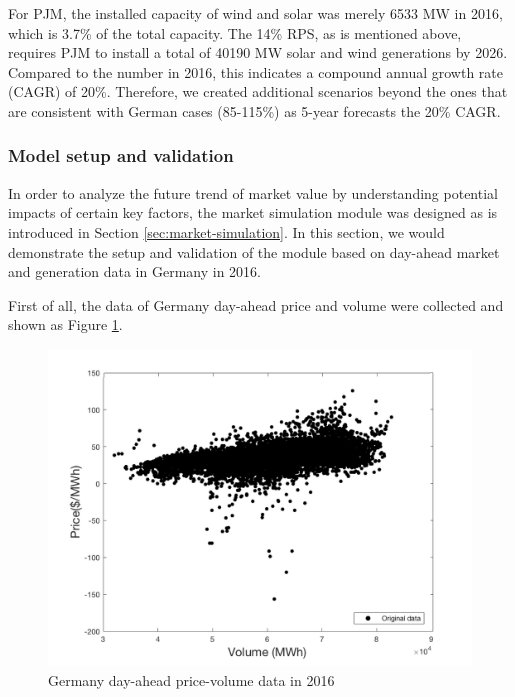 

For PJM, the installed capacity of wind and solar was merely 6533 MW in 2016, which is 3.7\% of the total capacity. The 14\% RPS, as is mentioned above, requires PJM to install a total of \num{40190} MW solar and wind generations by 2026. Compared to the number in 2016, this indicates a compound annual growth rate (CAGR) of 20\%. Therefore, we created additional scenarios beyond the ones that are consistent with German cases (85-115\%) as 5-year forecasts the 20\% CAGR.

\subsubsection{Model setup and validation}
In order to analyze the future trend of market value by understanding potential impacts of certain key factors, the market simulation module was designed as is introduced in Section \ref{sec:market-simulation}. In this section, we would demonstrate the setup and validation of the module  based on day-ahead market and generation data in Germany in 2016.

First of all, the data of Germany day-ahead price and volume were collected and shown as Figure \ref{fig:merit-orignal}.

\begin{figure}[h!]
	\centering
	\includegraphics[width=0.95\linewidth]{Figures/Merit-order-original}
	\caption{Germany day-ahead price-volume data in 2016}
	\label{fig:merit-orignal}
\end{figure}

